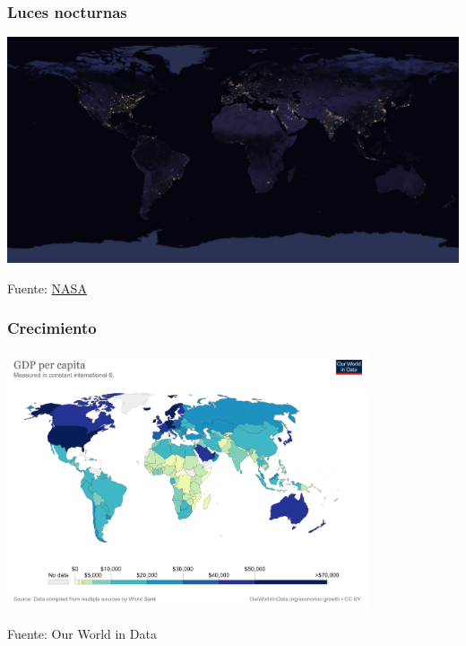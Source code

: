 \documentclass{beamer}
\begin{document}
\begin{frame}
\frametitle{Luces nocturnas}
\begin{center}
    \includegraphics[scale=0.06]{../Tema_11.11_crecimiento2.jpg}
\end{center}
Fuente: \href{https://www.nasa.gov/feature/goddard/2017/new-night-lights-maps-open-up-possible-real-time-applications}{NASA}
\end{frame}

\begin{frame}
\frametitle{Crecimiento}
\begin{center}
    \href{https://ourworldindata.org/grapher/gdp-per-capita-worldbank} {\includegraphics[width=0.8\textwidth]{../Figures/gdppc2020.png}}
\end{center}
Fuente: Our World in Data
\end{frame}
\end{document}
